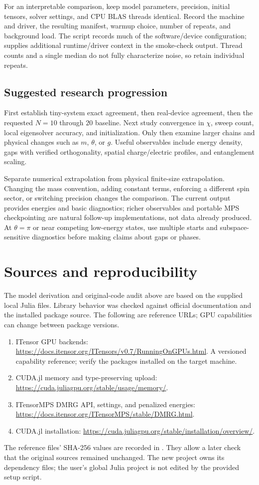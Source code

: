For an interpretable comparison, keep model parameters, precision, initial tensors, solver settings, and CPU BLAS threads identical. Record the machine and driver, the resulting manifest, warmup choice, number of repeats, and background load. The script records much of the software/device configuration;  supplies additional runtime/driver context in the smoke-check output. Thread counts and a single median do not fully characterize noise, so retain individual repeats.

\subsection{Suggested research progression}
First establish tiny-system exact agreement, then real-device agreement, then the requested $N=10$ through $20$ baseline. Next study convergence in $\chi$, sweep count, local eigensolver accuracy, and initialization. Only then examine larger chains and physical changes such as $m$, $\theta$, or $g$. Useful observables include energy density, gaps with verified orthogonality, spatial charge/electric profiles, and entanglement scaling.

Separate numerical extrapolation from physical finite-size extrapolation. Changing the mass convention, adding constant terms, enforcing a different spin sector, or switching precision changes the comparison. The current output provides energies and basic diagnostics; richer observables and portable MPS checkpointing are natural follow-up implementations, not data already produced. At $\theta=\pi$ or near competing low-energy states, use multiple starts and subspace-sensitive diagnostics before making claims about gaps or phases.

\section{Sources and reproducibility}
The model derivation and original-code audit above are based on the supplied local Julia files. Library behavior was checked against official documentation and the installed package source. The following are reference URLs; GPU capabilities can change between package versions.
\begin{enumerate}
\item ITensor GPU backends: \url{https://docs.itensor.org/ITensors/v0.7/RunningOnGPUs.html}. A versioned capability reference; verify the packages installed on the target machine.
\item CUDA.jl memory and type-preserving upload: \url{https://cuda.juliagpu.org/stable/usage/memory/}.
\item ITensorMPS DMRG API, settings, and penalized energies: \url{https://docs.itensor.org/ITensorMPS/stable/DMRG.html}.
\item CUDA.jl installation: \url{https://cuda.juliagpu.org/stable/installation/overview/}.
\end{enumerate}
The reference files' SHA-256 values are recorded in . They allow a later check that the original sources remained unchanged. The new project owns its dependency files; the user's global Julia project is not edited by the provided setup script.
